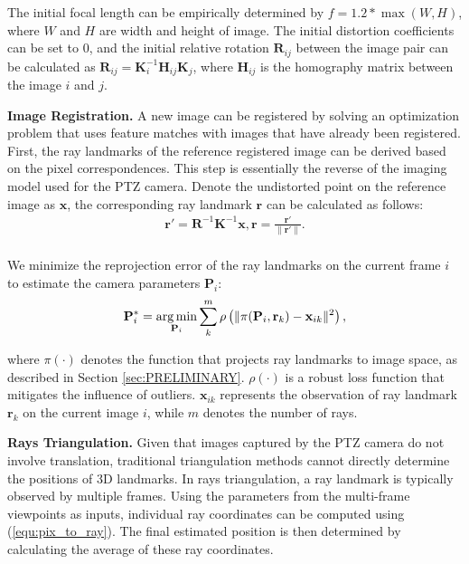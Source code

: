 The initial focal length can be empirically determined by $f=1.2*\max(W, H)$, where $W$ and $H$ are width and height of image. The initial distortion coefficients can be set to 0, and the initial relative rotation $\mathbf{R}_{ij}$ between the image pair can be calculated as $\mathbf{R}_{ij}=\mathbf{K}_i^{-1}\mathbf{H}_{ij}\mathbf{K}_j$, where $\mathbf{H}_{ij}$ is the homography matrix between the image $i$ and $j$.

\textbf{Image Registration.}
A new image can be registered by solving an optimization problem that uses feature matches with images that have already been registered. 
First, the ray landmarks of the reference registered image can be derived based on the pixel correspondences. This step is essentially the reverse of the imaging model used for the PTZ camera. Denote the undistorted point on the reference image as $\mathbf{x}$, the corresponding ray landmark $\mathbf{r}$ can be calculated as follows:
\begin{equation}
\label{equ:pix_to_ray}
\begin{aligned}
    \mathbf{r}' = \mathbf{R}^{-1} \mathbf{K}^{-1} \mathbf{x}, \mathbf{r} = \frac{\mathbf{r}'}{\|\mathbf{r}'\|}. \\
\end{aligned}
\end{equation}

We minimize the reprojection error of the ray landmarks on the current frame $i$ to estimate the camera parameters $\mathbf{P}_i$:
\begin{equation}
\label{equ:img_reg}
    \mathbf{P}_i^* = \operatorname*{arg\,min}_{\mathbf{P}_i} \sum^m_k \rho \left( \| \pi(\mathbf{P}_i, \mathbf{r}_k) - \mathbf{x}_{ik} \|^2 \right),
\end{equation}

\noindent where $\pi(\cdot)$ denotes the function that projects ray landmarks to image space, as described in Section \ref{sec:PRELIMINARY}. $\rho(\cdot)$ is a robust loss function that mitigates the influence of outliers. $\mathbf{x}_{ik}$ represents the observation of ray landmark $\mathbf{r}_k$ on the current image $i$, while $m$ denotes the number of rays.

\textbf{Rays Triangulation.}
Given that images captured by the PTZ camera do not involve translation, traditional triangulation methods cannot directly determine the positions of 3D landmarks.
In rays triangulation, a ray landmark is typically observed by multiple frames. Using the parameters from the multi-frame viewpoints as inputs, 
individual ray coordinates can be computed using (\ref{equ:pix_to_ray}). The final estimated position is then determined by calculating the average of these ray coordinates.

